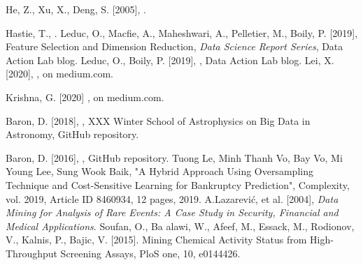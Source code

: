 \begin{thebibliography}{99}
 He, Z., Xu, X.,  Deng, S. [2005], . 

 Hastie, T., .
 Leduc, O., Macfie, A., Maheshwari, A., Pelletier, M., Boily, P. [2019], Feature Selection and Dimension Reduction, \textit{Data Science Report Series}, Data Action Lab blog. 
 Leduc, O., Boily, P. [2019], , Data Action Lab blog.
 Lei, X. [2020], , on medium.com.

 Krishna, G. [2020] , on medium.com.

 Baron, D. [2018],  , XXX Winter School of Astrophysics on Big Data in Astronomy, GitHub repository.

 Baron, D. [2016], , GitHub repository.
 Tuong Le, Minh Thanh Vo, Bay Vo, Mi Young Lee, Sung Wook Baik, "A Hybrid Approach Using Oversampling Technique and Cost-Sensitive Learning for Bankruptcy Prediction", Complexity, vol. 2019, Article ID 8460934, 12 pages, 2019.
 A.Lazarević, {et al.} [2004], \textit{Data Mining for Analysis of Rare Events: A Case Study in Security, Financial and Medical Applications}.
 Soufan, O., Ba alawi, W.,   Afeef, M., Essack, M., Rodionov, V., Kalnis, P., Bajic, V. [2015]. Mining Chemical Activity Status from High-Throughput Screening Assays, PloS one,  10, e0144426. \end{thebibliography}







